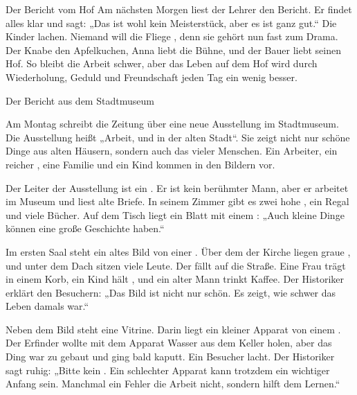 \documentclass[12pt]{nextbook}
\begin{document}
\begin{readersection}{Der Bericht vom Hof}
Am nächsten Morgen liest der Lehrer den Bericht. Er findet alles klar und sagt: „Das ist wohl kein Meisterstück, aber es ist ganz gut.“ Die Kinder lachen. Niemand will die Fliege , denn sie gehört nun fast zum Drama. Der Knabe  den Apfelkuchen, Anna liebt die Bühne, und der Bauer liebt seinen Hof. So bleibt die Arbeit schwer, aber das Leben auf dem Hof wird durch Wiederholung, Geduld und Freundschaft jeden Tag ein wenig besser.

\end{readersection}


\begin{readersection}{Der Bericht aus dem Stadtmuseum}

Am Montag schreibt die Zeitung über eine neue Ausstellung im Stadtmuseum. Die Ausstellung heißt „Arbeit,  und  in der alten Stadt“. Sie zeigt nicht nur schöne Dinge aus alten Häusern, sondern auch das  vieler Menschen. Ein  Arbeiter, ein reicher , eine  Familie und ein  Kind kommen in den Bildern vor.

Der Leiter der Ausstellung ist ein . Er ist kein berühmter Mann, aber er arbeitet  im Museum und liest  alte Briefe. In seinem Zimmer gibt es zwei hohe , ein  Regal und viele Bücher. Auf dem Tisch liegt ein Blatt mit einem  : „Auch kleine Dinge können eine große Geschichte haben.“

Im ersten Saal steht ein altes Bild von einer . Über dem  der Kirche liegen graue , und unter dem Dach sitzen viele Leute. Der  fällt auf die Straße. Eine Frau trägt   in einem Korb, ein Kind hält  , und ein alter Mann trinkt  Kaffee. Der Historiker erklärt den Besuchern: „Das Bild ist nicht nur schön. Es zeigt, wie schwer das Leben damals war.“

Neben dem Bild steht eine Vitrine. Darin liegt ein kleiner Apparat von einem . Der Erfinder wollte mit dem Apparat Wasser aus dem Keller holen, aber das Ding war zu  gebaut und ging bald kaputt. Ein Besucher lacht. Der Historiker sagt ruhig: „Bitte kein . Ein schlechter Apparat kann trotzdem ein wichtiger Anfang sein. Manchmal  ein Fehler die Arbeit nicht, sondern hilft dem Lernen.“


\end{readersection}
\end{document}
